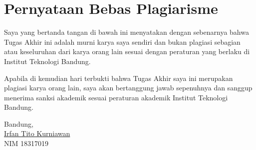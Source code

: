 \chapter*{Pernyataan Bebas Plagiarisme}

Saya yang bertanda tangan di bawah ini menyatakan dengan sebenarnya bahwa Tugas Akhir ini adalah murni karya saya sendiri dan bukan plagiasi sebagian atau keseluruhan dari karya orang lain sesuai dengan peraturan yang berlaku di Institut Teknologi Bandung.

Apabila di kemudian hari terbukti bahwa Tugas Akhir saya ini merupakan plagiasi karya orang lain, saya akan bertanggung jawab sepenuhnya dan sanggup menerima sanksi akademik sesuai peraturan akademik Institut Teknologi Bandung.
\\[\baselineskip]

\hfill
\parbox{5.5cm}{
	Bandung, \thedate \\[2\baselineskip]
	\underline{Irfan Tito Kurniawan} \\
	NIM 18317019
}


